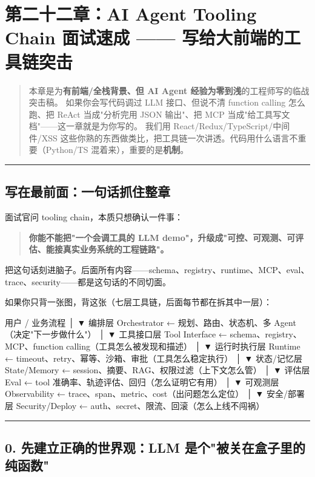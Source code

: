 \chapter{第二十二章：AI Agent Tooling Chain 面试速成 —— 写给大前端的工具链突击}

\begin{quote}
本章是为\textbf{有前端/全栈背景、但 AI Agent 经验为零到浅}的工程师写的临战突击稿。
如果你会写代码调过 LLM 接口、但说不清 function calling 怎么跑、把 ReAct 当成"分析完用 JSON 输出"、把 MCP 当成"给工具写文档"——这一章就是为你写的。
我们用 React/Redux/TypeScript/中间件/XSS 这些你熟的东西做类比，把工具链一次讲透。代码用什么语言不重要（Python/TS 混着来），重要的是\textbf{机制}。
\end{quote}

\bigskip\hrule\bigskip

\section{写在最前面：一句话抓住整章}

面试官问 tooling chain，本质只想确认一件事：

\begin{quote}
\textbf{你能不能把"一个会调工具的 LLM demo"，升级成"可控、可观测、可评估、能接真实业务系统的工程链路"。}
\end{quote}

把这句话刻进脑子。后面所有内容——schema、registry、runtime、MCP、eval、trace、security——都是这句话的不同切面。

如果你只背一张图，背这张（七层工具链，后面每节都在拆其中一层）：

\begin{codeblock}
用户 / 业务流程
      │
      ▼
编排层  Orchestrator     ← 规划、路由、状态机、多 Agent（决定"下一步做什么"）
      │
      ▼
工具接口层 Tool Interface ← schema、registry、MCP、function calling（工具怎么被发现和描述）
      │
      ▼
运行时执行层 Runtime      ← timeout、retry、幂等、沙箱、审批（工具怎么稳定执行）
      │
      ▼
状态/记忆层 State/Memory  ← session、摘要、RAG、权限过滤（上下文怎么管）
      │
      ▼
评估层 Eval              ← tool 准确率、轨迹评估、回归（怎么证明它有用）
      │
      ▼
可观测层 Observability    ← trace、span、metric、cost（出问题怎么定位）
      │
      ▼
安全/部署层 Security/Deploy ← auth、secret、限流、回滚（怎么上线不闯祸）
\end{codeblock}

\bigskip\hrule\bigskip

\section{0. 先建立正确的世界观：LLM 是个"被关在盒子里的纯函数"}

